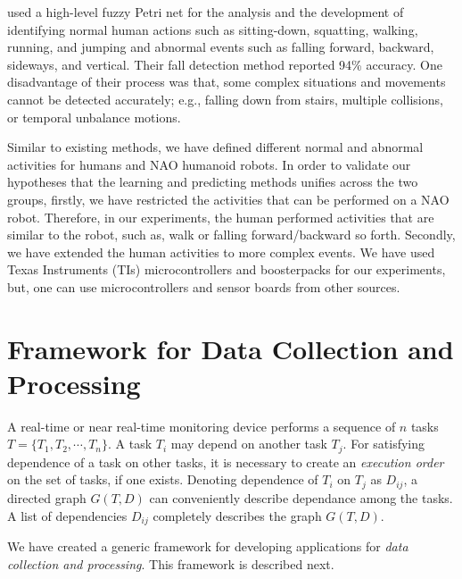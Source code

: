 \documentclass{IEEEtran}
\begin{document}
\cite{ShenFallDetectionPhone2015} used a  high-level fuzzy Petri net for the analysis and the development of 
identifying normal human actions such as sitting-down, squatting, walking, running, and jumping and 
abnormal events such as falling forward, backward, sideways, and vertical. Their fall detection 
method reported 94\% accuracy. One disadvantage of their process was that, some complex situations 
and movements cannot be detected accurately; e.g., falling down from  stairs, multiple collisions, 
or temporal unbalance motions.

Similar to existing methods, we have defined different normal and abnormal activities for humans 
and NAO humanoid robots. In order to validate our hypotheses that the learning and predicting 
methods unifies across the two groups, firstly, we have restricted the activities that can be 
performed on a NAO robot. Therefore, in our experiments, the human performed activities that are 
similar to the robot, such as, walk or falling forward/backward so forth. Secondly, we have 
extended the human activities to more complex events.  We have used Texas Instruments 
(TIs)  microcontrollers and boosterpacks for our experiments, 
but, one can use microcontrollers and  sensor boards from other sources.  


\section{Framework for Data Collection and Processing}
\label{sec:framework}

A real-time or near real-time monitoring device performs a sequence of $n$ tasks $T = \{ T_1, T_2,\cdots,T_n\}$. A task $T_i$ may depend on another task $T_j$.  For satisfying dependence of a task on other tasks, it is necessary to create an \emph{execution order} on the set of tasks, if one exists. Denoting dependence of $T_i$ on $T_j$ as $D_{ij}$, a directed graph $G(T,D)$ can conveniently describe dependance among the tasks. A list of dependencies $D_{ij}$ completely describes the graph $G(T,D)$.
\par
We have created a generic framework for developing applications for \emph{data collection and processing}. This framework is described next.
\end{document}
